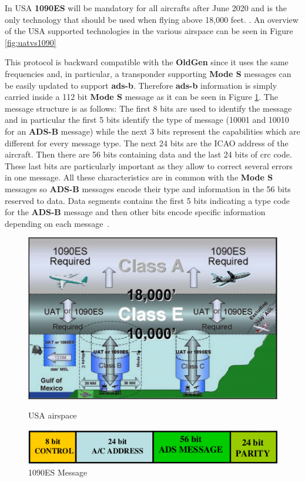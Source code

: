 \documentclass[../main.tex]{subfiles}
\begin{document}
In USA \textbf{1090ES} will be mandatory for all aircrafts after June 2020 and is the only technology that should be used when flying above 18,000 feet.
\cite{title14}. An overview of the USA supported technologies in the various airspace can be seen in Figure \ref{fig:uatvs1090}

This protocol is backward compatible with the \textbf{OldGen} since it uses the same frequencies and, in particular, a transponder supporting \textbf{Mode S} messages can be easily updated to support \textbf{\acrshort{ads-b}}. Therefore \textbf{\acrshort{ads-b}} information is simply carried inside a 112 bit \textbf{Mode S} message as it can be seen in Figure \ref{fig:1090es}. The message structure is as follows: The first 8 bits are used to identify the message and in particular the first 5 bits identify the type of message (10001 and 10010 for an \textbf{ADS-B} message) while the next 3 bits represent the capabilities which are different for every message type. The next 24 bits are the ICAO address of the aircraft. Then there are 56 bits containing data and the last 24 bits of \acrshort{crc} code. These last bits are particularly important as they allow to correct several errors in one message. All these characteristics are in common with the \textbf{Mode S} messages so \textbf{ADS-B} messages encode their type and information in the 56 bits reserved to data. Data segments contains the first 5 bits indicating a type code for the \textbf{ADS-B} message and then other bits encode specific information depending on each message~\cite{modesbook}.


\begin{figure}[htp]
\centering
\begin{minipage}{.5\textwidth}
  \centering
  \includegraphics[scale=0.35]{images/uatvs1090.png}
  \caption{USA airspace}
  \label{fig:uatvs1090}
\end{minipage}%
\begin{minipage}{.5\textwidth}
  \centering
  \includegraphics[scale=0.45]{images/1090es.png}
  \caption{1090ES Message}
  \label{fig:1090es}
\end{minipage}
\end{figure}
\end{document}
